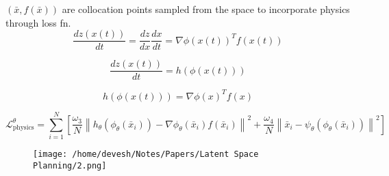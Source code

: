 \documentclass[12pt]{article}
\begin{document}
\begin{multicols}{2}
\((\bar{x}, f(\bar{x}))\) are collocation points sampled from the space to incorporate physics through loss fn. 
\[
\frac{d z(x(t))}{d t} = \frac{d z}{d x} \frac{d x}{d t} = \nabla \phi(x(t))^T f(x(t))
\]

\[
\frac{d z(x(t))}{d t} = h(\phi(x(t)))
\]

\[
h(\phi(x(t))) = \nabla \phi(x)^T f(x)
\]
\end{multicols}

\[
\mathcal{L}_{\text{physics}}^{\theta} = \sum_{i=1}^{N} \left[ \frac{\omega_3}{N} \left\| h_{\theta} (\phi_{\theta} (\bar{x}_i)) - \nabla \phi_{\theta} (\bar{x}_i) f(\bar{x}_i) \right\|^2 + \frac{\omega_4}{N} \left\| \bar{x}_i - \psi_{\theta} (\phi_{\theta} (\bar{x}_i)) \right\|^2 \right]
\]
\begin{figure}[ht]
    \centering
    \texttt{[image: /home/devesh/Notes/Papers/Latent Space Planning/2.png]}
    \caption{}
    \label{fig:pinode}
\end{figure}

\newpage
\end{document}
